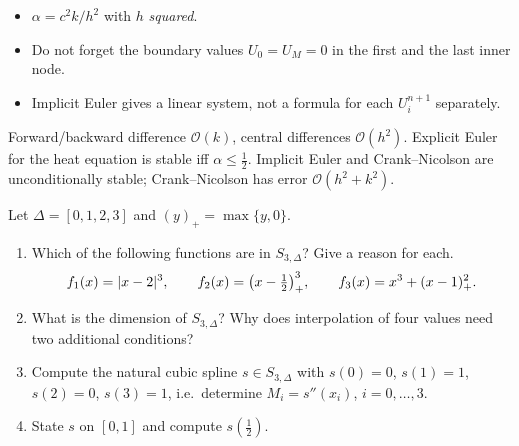 \begin{solution}
\begin{trap}
\begin{itemize}
\item $\alpha=c^2k/h^2$ with $h$ \emph{squared}.
\item Do not forget the boundary values $U_0=U_M=0$ in the first and the last inner node.
\item Implicit Euler gives a linear system, not a formula for each $U_i^{n+1}$ separately.
\end{itemize}
\end{trap}
\begin{heart}
Forward/backward difference $\mathcal O(k)$, central differences $\mathcal O(h^2)$. Explicit Euler for the heat equation is stable iff $\alpha\le\frac12$. Implicit Euler and Crank--Nicolson are unconditionally stable; Crank--Nicolson has error $\mathcal O(h^2+k^2)$.
\end{heart}
\end{solution}

Let $\Delta=[0,1,2,3]$ and $(y)_+=\max\{y,0\}$.
\begin{enumerate}
\item Which of the following functions are in $S_{3,\Delta}$? Give a reason for each.
\[
f_1(x)=\lvert x-2\rvert^3,\qquad f_2(x)=\big(x-\tfrac12\big)_+^3,\qquad f_3(x)=x^3+(x-1)_+^2.
\]
\item What is the dimension of $S_{3,\Delta}$? Why does interpolation of four values need two additional conditions?
\item Compute the natural cubic spline $s\in S_{3,\Delta}$ with $s(0)=0$, $s(1)=1$, $s(2)=0$, $s(3)=1$, i.e.\ determine $M_i=s''(x_i)$, $i=0,\dots,3$.
\item State $s$ on $[0,1]$ and compute $s(\frac12)$.
\end{enumerate}

